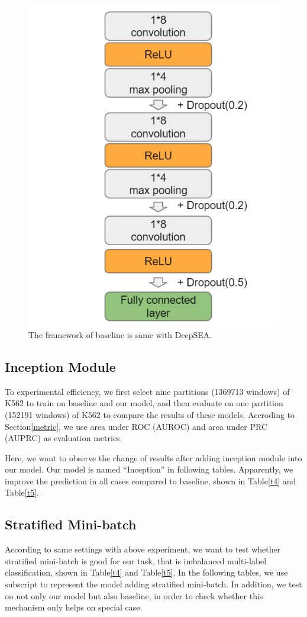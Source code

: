 \begin{figure}[H]
    \centering
    \includegraphics[width=0.6\columnwidth]{body/figure/figure16.png}
    \captionsetup{labelfont=bf}
    \renewcommand{\baselinestretch}{1.0}
    \caption[Framework of baseline]{The framework of baseline is same with DeepSEA.}
    \label{f16}
\end{figure}

\subsection{Inception Module}
To experimental efficiency, we first select nine partitions (1369713 windows) of K562 to train on baseline and our model, and then evaluate on one partition (152191 windows) of K562 to compare the results of these models. Accroding to Section\ref{metric}, we use area under ROC (AUROC) and area under PRC (AUPRC) as evaluation metrics.

Here, we want to observe the change of results after adding inception module into our model. Our model is named “Inception” in following tables. Apparently, we improve the prediction in all cases compared to baseline, shown in Table\ref{t4} and Table\ref{t5}.

\subsection{Stratified Mini-batch} \label{strat}
According to same settings with above experiment, we want to test whether stratified mini-batch is good for our task, that is imbalanced multi-label classification, shown in Table\ref{t4} and Table\ref{t5}. In the following tables, we use subscript to represent the model adding stratified mini-batch. In addition, we test on not only our model but also baseline, in order to check whether this mechanism only helps on special case.

